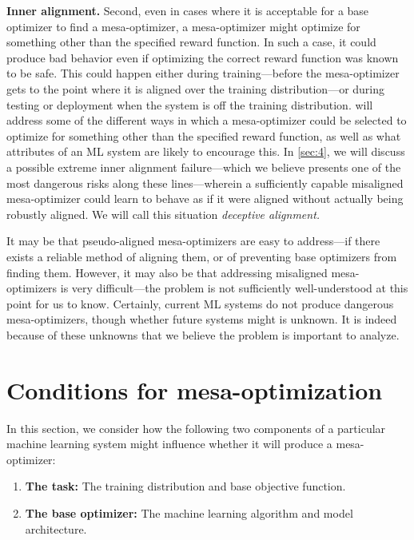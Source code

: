 \documentclass[
  onecolumn,
  natbib,
]{miri-tech-article}
\begin{document}
\textbf{Inner alignment.} Second, even in cases where it is acceptable for a base optimizer to find a mesa-optimizer, a mesa-optimizer might optimize for something other than the specified reward function. In such a case, it could produce bad behavior even if optimizing the correct reward function was known to be safe. This could happen either during training---before the mesa-optimizer gets to the point where it is aligned over the training distribution---or during testing or deployment when the system is off the training distribution.  will address some of the different ways in which a mesa-optimizer could be selected to optimize for something other than the specified reward function, as well as what attributes of an ML system are likely to encourage this. In \cref{sec:4}, we will discuss a possible extreme inner alignment failure---which we believe presents one of the most dangerous risks along these lines---wherein a sufficiently capable misaligned mesa-optimizer could learn to behave as if it were aligned without actually being robustly aligned. We will call this situation \textit{deceptive alignment.}

It may be that pseudo-aligned mesa-optimizers are easy to address---if there exists a reliable method of aligning them, or of preventing base optimizers from finding them. However, it may also be that addressing misaligned mesa-optimizers is very difficult---the problem is not sufficiently well-understood at this point for us to know. Certainly, current ML systems do not produce dangerous mesa-optimizers, though whether future systems might is unknown. It is indeed because of these unknowns that we believe the problem is important to analyze.

\section{Conditions for mesa-optimization}
\label{sec:2}

In this section, we consider how the following two components of a particular machine learning system might influence whether it will produce a mesa-optimizer:
\begin{enumerate}
\item \textbf{The task:} The training distribution and base objective function.
\item \textbf{The base optimizer:} The machine learning algorithm and model architecture.
\end{enumerate}
\end{document}

